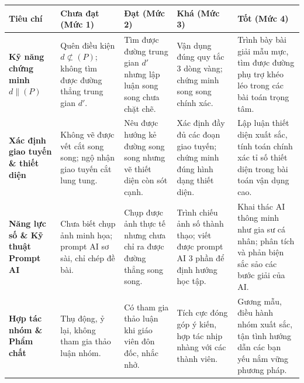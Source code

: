 \documentclass[12pt, a4paper]{article}
\begin{document}
\begin{center}
\small
\begin{tabularx}{\textwidth}{|p{2.8cm}|X|X|X|X|}
\hline
\textbf{Tiêu chí} & \textbf{Chưa đạt (Mức 1)} & \textbf{Đạt (Mức 2)} & \textbf{Khá (Mức 3)} & \textbf{Tốt (Mức 4)} \\ \hline
\textbf{Kỹ năng chứng minh $d \parallel (P)$} & Quên điều kiện $d \not\subset (P)$; không tìm được đường thẳng trung gian $d'$. & Tìm được đường trung gian $d'$ nhưng lập luận song song chưa chặt chẽ. & Vận dụng đúng quy tắc 3 dòng vàng; chứng minh song song chính xác. & Trình bày bài giải mẫu mực, tìm được đường phụ trợ khéo léo trong các bài toán trọng tâm. \\ \hline
\textbf{Xác định giao tuyến \& thiết diện} & Không vẽ được vết cắt song song; ngộ nhận giao tuyến cắt lung tung. & Nêu được hướng kẻ đường song song nhưng vẽ thiết diện còn sót cạnh. & Xác định đầy đủ các đoạn giao tuyến; chứng minh đúng hình dạng thiết diện. & Lập luận thiết diện xuất sắc, tính toán chính xác tỉ số thiết diện trong bài toán vận dụng cao. \\ \hline
\textbf{Năng lực số \& Kỹ thuật Prompt AI} & Chưa biết chụp ảnh minh họa; prompt AI sơ sài, chỉ chép đề bài. & Chụp được ảnh thực tế nhưng chưa chỉ ra được đường thẳng song song. & Trình chiếu ảnh số thành thạo; viết được prompt AI 3 phần để định hướng học tập. & Khai thác AI thông minh như gia sư cá nhân; phân tích và phản biện sắc sảo các bước giải của AI. \\ \hline
\textbf{Hợp tác nhóm \& Phẩm chất} & Thụ động, ỷ lại, không tham gia thảo luận nhóm. & Có tham gia thảo luận khi giáo viên đôn đốc, nhắc nhở. & Tích cực đóng góp ý kiến, hợp tác nhịp nhàng với các thành viên. & Gương mẫu, điều hành nhóm xuất sắc, tận tình hướng dẫn các bạn yếu nắm vững phương pháp. \\ \hline
\end{tabularx}
\end{center}
\end{document}
